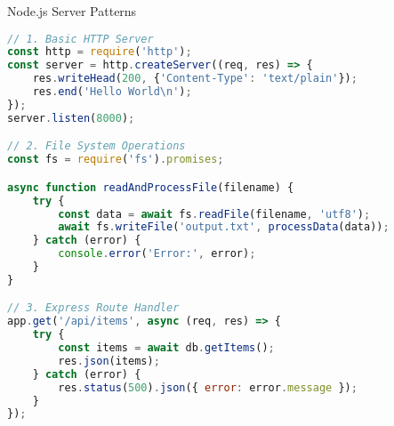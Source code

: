 \begin{examplecode}{Node.js Server Patterns}
\begin{lstlisting}[language=JavaScript, style=basesmol]
// 1. Basic HTTP Server
const http = require('http');
const server = http.createServer((req, res) => {
    res.writeHead(200, {'Content-Type': 'text/plain'});
    res.end('Hello World\n');
});
server.listen(8000);

// 2. File System Operations
const fs = require('fs').promises;

async function readAndProcessFile(filename) {
    try {
        const data = await fs.readFile(filename, 'utf8');
        await fs.writeFile('output.txt', processData(data));
    } catch (error) {
        console.error('Error:', error);
    }
}

// 3. Express Route Handler
app.get('/api/items', async (req, res) => {
    try {
        const items = await db.getItems();
        res.json(items);
    } catch (error) {
        res.status(500).json({ error: error.message });
    }
});
\end{lstlisting}
\end{examplecode}